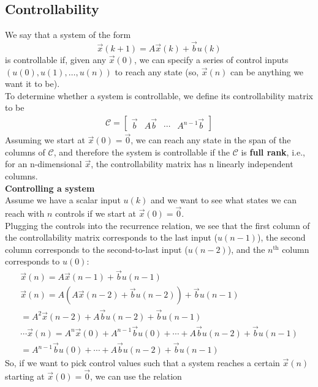 \subsection*{Controllability}
We say that a system of the form
$$\vec{x}(k + 1) = A\vec{x}(k) + \vec{b} u(k)$$
is controllable if, given any $\vec{x}(0)$, we can specify a series of control inputs $(u(0), u(1), \dots, u(n))$ to reach any state (so, $\vec{x}(n)$ can be anything we want it to be). \\
To determine whether a system is controllable, we define its controllability matrix to be
\begin{align*}
    \boxed{\mathcal{C} = \begin{bmatrix}
        \vec{b} & A\vec{b} & \cdots & A^{n - 1} \vec{b}
    \end{bmatrix}}
\end{align*}
Assuming we start at $\vec{x}(0) = \vec{0}$, we can reach any state in the span of the columns of $\mathcal{C}$, and therefore the system is controllable if the $\mathcal{C}$ is \textbf{full rank}, i.e., for an n-dimensional $\vec{x}$, the controllability matrix has n linearly independent columns. \\
\newline
\textbf{Controlling a system} \\
\newline
Assume we have a scalar input $u(k)$ and we want to see what states we can reach with $n$ controls if we start at $\vec{x}(0) = \vec{0}$. \\ 
\newline
Plugging the controls into the recurrence relation, we see that the first column of the controllability matrix corresponds to the last input ($u(n - 1)$), the second column corresponds to the second-to-last input ($u(n - 2)$), and the $n^{\text{th}}$ column corresponds to $u(0)$: 
\begin{align*}
    \vec{x}(n) = A\vec{x}(n - 1) + \vec{b} u(n - 1) \\
    \vec{x}(n) = A(A \vec{x}(n - 2) + \vec{b} u(n - 2)) + \vec{b} u(n - 1) \\
    = A^2 \vec{x}(n - 2) + A\vec{b} u(n - 2) + \vec{b} u(n - 1) \\
    \cdots
    \vec{x}(n) = A^n \vec{x}(0) + A^{n - 1} \vec{b} u(0) + \cdots +  A\vec{b} u(n - 2) + \vec{b} u(n - 1) \\
    = A^{n - 1} \vec{b} u(0) + \cdots +  A\vec{b} u(n - 2) + \vec{b} u(n - 1)
\end{align*}
So, if we want to pick control values such that a system reaches a certain $\vec{x}(n)$ starting at $\vec{x}(0) = \vec{0}$, we can use the relation
